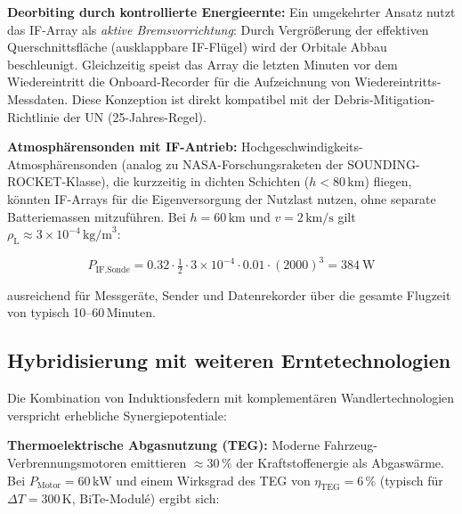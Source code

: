 ﻿\documentclass[12pt, a4paper]{report}
\theoremstyle{definition}
\theoremstyle{remark}
\newcommand{\rhoL}{\rho_{\text{L}}}
\begin{document}
\textbf{Deorbiting durch kontrollierte Energieernte:}
Ein umgekehrter Ansatz nutzt das IF-Array als \emph{aktive Bremsvorrichtung}:
Durch Vergrößerung der effektiven Querschnittsfläche (ausklappbare IF-Flügel)
wird der Orbitale Abbau beschleunigt. Gleichzeitig speist das Array die
letzten Minuten vor dem Wiedereintritt die Onboard-Recorder für die
Aufzeichnung von Wiedereintritts-Messdaten. Diese Konzeption ist direkt
kompatibel mit der Debris-Mitigation-Richtlinie der UN (25-Jahres-Regel).

\textbf{Atmosphärensonden mit IF-Antrieb:}
Hochgeschwindigkeits-Atmosphären\-sonden (analog zu NASA-Forschungsraketen
der SOUNDING-ROCKET-Klasse), die kurzzeitig in dichten Schichten ($h < 80\,\text{km}$)
fliegen, könnten IF-Arrays für die Eigenversorgung der Nutzlast nutzen,
ohne separate Batteriemassen mitzuführen. Bei $h = 60\,\text{km}$ und
$v = 2\,\text{km/s}$ gilt $\rhoL \approx 3 \times 10^{-4}\,\text{kg/m}^3$:

\begin{equation}
  P_{\text{IF,Sonde}} = 0.32 \cdot \tfrac{1}{2} \cdot 3 \times 10^{-4} \cdot 0.01 \cdot (2000)^3
  = \SI{384}{\watt}
  \label{eq:p_sonde}
\end{equation}

ausreichend für Messgeräte, Sender und Datenrekorder über die gesamte
Flugzeit von typisch 10--60\,Minuten.

\subsection{Hybridisierung mit weiteren Erntetechnologien}
\label{ssec:ausblick_hybrid}

Die Kombination von Induktionsfedern mit komplementären Wandlertechnologien
verspricht erhebliche Synergiepotentiale:

\textbf{Thermoelektrische Abgasnutzung (TEG):}
Moderne Fahrzeug-Verbrennungsmoto\-ren emittieren $\approx 30\,\%$ der
Kraftstoffenergie als Abgaswärme. Bei $P_{\text{Motor}} = 60\,\text{kW}$
und einem Wirk\-sgrad des TEG von $\eta_{\text{TEG}} = 6\,\%$ (typisch für
$\Delta T = 300\,\text{K}$, BiTe-Modulé) ergibt sich:
\end{document}
